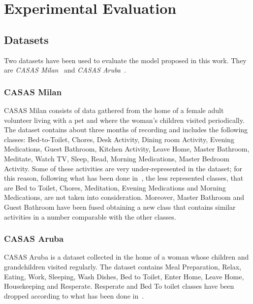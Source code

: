 \section{Experimental Evaluation}

\subsection{Datasets}

Two datasets have been used to evaluate the model proposed in this work. They are \textit{CASAS Milan}~\cite{cook2009assessing} and \textit{CASAS Aruba}~\cite{cook2010learning}. 

\subsubsection{CASAS Milan}    

CASAS Milan consists of data gathered from the home of a female adult volunteer living with a pet and where the woman's children visited periodically. The dataset contains about three months of recording and includes the following classes: Bed-to-Toilet, Chores, Desk Activity, Dining room Activity, Evening Medications, Guest Bathroom, Kitchen Activity, Leave Home, Master Bathroom, Meditate, Watch TV, Sleep, Read, Morning Medications, Master Bedroom Activity. Some of these activities are very under-represented in the dataset; for this reason, following what has been done in~\cite{arrotta2022dexar}, the less represented classes, that are Bed to Toilet, Chores, Meditation, Evening Medications and Morning Medications, are not taken into consideration. Moreover, Master Bathroom and Guest Bathroom have been fused obtaining a new class that contains similar activities in a number comparable with the other classes.

\subsubsection{CASAS Aruba} 
CASAS Aruba is a dataset collected in the home of a woman whose children and grandchildren visited regularly. The dataset contains Meal Preparation, Relax, Eating, Work, Sleeping, Wash Dishes, Bed to Toilet, Enter Home, Leave Home, Housekeeping and Resperate. Resperate and Bed To toilet classes have been dropped according to what has been done in~\cite{liciotti2020sequential}.

